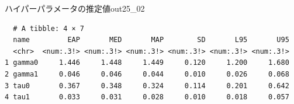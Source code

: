 \begin{MCMCout}{ハイパーパラメータの推定値}{out25_02}
	\begin{verbatim}
  # A tibble: 4 × 7
  name         EAP       MED       MAP        SD       L95       U95
  <chr>  <num:.3!> <num:.3!> <num:.3!> <num:.3!> <num:.3!> <num:.3!>
1 gamma0     1.446     1.448     1.449     0.120     1.200     1.680
2 gamma1     0.046     0.046     0.044     0.010     0.026     0.068
3 tau0       0.367     0.348     0.324     0.114     0.201     0.642
4 tau1       0.033     0.031     0.028     0.010     0.018     0.057
\end{verbatim}
\end{MCMCout}
